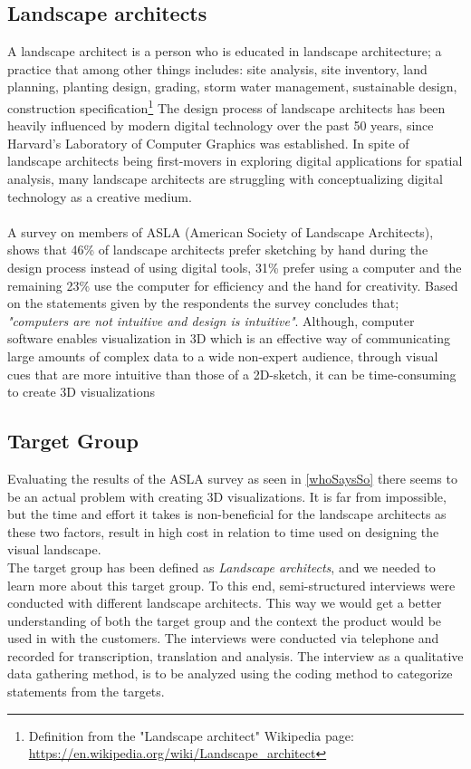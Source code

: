 	\subsection{Landscape architects}\label{whoSaysSo}
 	A landscape architect is a person who is educated in landscape architecture; a practice that among other things includes: site analysis, site inventory, land planning, planting design, grading, storm water management, sustainable design, construction specification\footnote{Definition from the "Landscape architect" Wikipedia page: \url{https://en.wikipedia.org/wiki/Landscape\_architect}}
 	The design process of landscape architects has been heavily influenced by modern digital technology over the past 50 years, since Harvard's Laboratory of Computer Graphics was established.\cite{landscapeArchitectureDigiTech} In spite of landscape architects being first-movers in exploring digital applications for spatial analysis, many landscape architects are struggling with conceptualizing digital technology as a creative medium\cite{landscapeArchitectureDigiTech}. \\
 	\\
 	A survey on members of ASLA (American Society of Landscape Architects)\cite{surveySketchVSDigital}, shows that 46\% of landscape architects prefer sketching by hand during the design process instead of using digital tools, 31\% prefer using a computer and the remaining 23\% use the computer for efficiency and the hand for creativity. Based on the statements given by the respondents the survey concludes that; \textit{"computers are not intuitive and design is intuitive"}\cite{landscapeArchitectureDigiTech}\cite{surveySketchVSDigital}. Although, computer software enables visualization in 3D which is an effective way of communicating large amounts of complex data to a wide non-expert audience, through visual cues that are more intuitive than those of a 2D-sketch, it can be time-consuming to create 3D visualizations\cite{landscapeVisual}
		
	\subsection{Target Group}\label{sec:targetGroup}
	Evaluating the results of the ASLA survey as seen in \autoref{whoSaysSo} there seems to be an actual problem with creating 3D visualizations. It is far from impossible, but the time and effort it takes is non-beneficial for the landscape architects as these two factors, result in high cost in relation to time used on designing the visual landscape. \\
	The target group has been defined as \textit{Landscape architects}, and we needed to learn more about this target group. To this end, semi-structured interviews were conducted with different landscape architects. This way we would get a better understanding of both the target group and the context the product would be used in with the customers. The interviews were conducted via telephone and recorded for transcription, translation and analysis. The interview as a qualitative data gathering method, is to be analyzed using the coding method to categorize statements from the targets.
	
